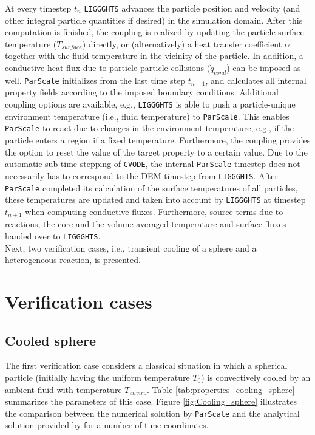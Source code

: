 \documentclass{particles2015}
\begin{document}
At every timestep $t_n$ \texttt{LIGGGHTS}\textsuperscript{\textregistered} advances the particle position and velocity (and other integral particle quantities if desired) in the simulation domain. After this computation is finished, the coupling is realized by updating the particle surface temperature ($T_{surface}$) directly, or (alternatively) a heat transfer coefficient $\alpha$ together with the fluid temperature in the vicinity of the particle. In addition, a conductive heat flux due to particle-particle collisions  ($\dot{q}_{cond}$) can be imposed as well. \texttt{ParScale} initializes from the last time step $t_{n-1}$, and calculates all internal property fields according to the imposed boundary conditions. Additional coupling options are available, e.g., \texttt{LIGGGHTS}\textsuperscript{\textregistered} is able to push a particle-unique environment temperature (i.e., fluid temperature) to \texttt{ParScale}. This enables \texttt{ParScale} to react due to changes in the environment temperature, e.g., if the particle enters a region if a fixed temperature. Furthermore, the coupling provides the option to reset the value of the target property to a certain value. Due to the automatic sub-time stepping of \texttt{CVODE}, the internal \texttt{ParScale} timestep does not necessarily has to correspond to the DEM timestep from \texttt{LIGGGHTS}\textsuperscript{\textregistered}. After \texttt{ParScale} completed its calculation of the surface temperatures of all particles, these temperatures are updated and taken into account by \texttt{LIGGGHTS}\textsuperscript{\textregistered} at timestep $t_{n+1}$ when computing conductive fluxes. Furthermore, source terms due to reactions, the core and the volume-averaged temperature and surface fluxes handed over to \texttt{LIGGGHTS}\textsuperscript{\textregistered}.\\
Next, two verification cases, i.e., transient cooling of a sphere and a heterogeneous reaction, is presented.

\section{Verification cases}
\label{sec:verification_case}

\subsection{Cooled sphere}
\label{sec:transient_cooling}
The first verification case considers a classical situation in which a spherical particle (initially having the uniform temperature $T_0$) is convectively cooled by an ambient fluid with temperature $T_{enviro}$. Table \ref{tab:properties_cooling_sphere} summarizes the parameters of this case. Figure \ref{fig:Cooling_sphere} illustrates the comparison between the numerical solution by \texttt{ParScale} and the analytical solution provided by \cite{Crank1975} for a number of time coordinates. 
\end{document}
